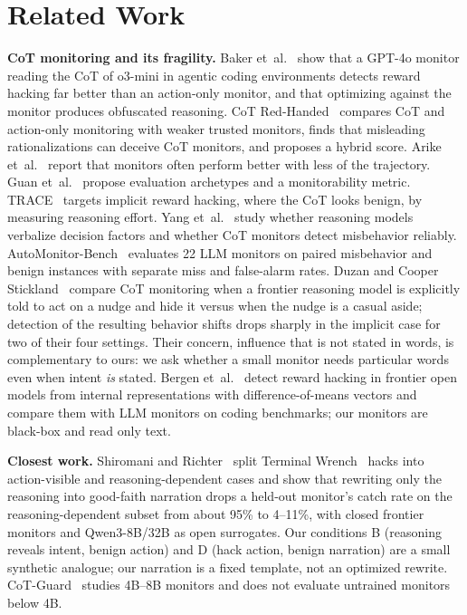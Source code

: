 \documentclass[conference]{IEEEtran}
\begin{document}
\section{Related Work}
\label{sec:related}
\textbf{CoT monitoring and its fragility.} Baker et~al.~\cite{baker2025monitoring} show that a GPT-4o monitor
reading the CoT of o3-mini in agentic coding environments detects reward hacking far better than an action-only
monitor, and that optimizing against the monitor produces obfuscated reasoning. CoT
Red-Handed~\cite{arnav2025redhanded} compares CoT and action-only monitoring with weaker trusted monitors,
finds that misleading rationalizations can deceive CoT monitors, and proposes a hybrid score.
Arike et~al.~\cite{arike2026information} report that monitors often perform better with less of the
trajectory. Guan et~al.~\cite{guan2025monitoring} propose evaluation archetypes and a monitorability metric.
TRACE~\cite{wang2026thinking} targets implicit reward hacking, where the CoT looks benign, by measuring
reasoning effort. Yang et~al.~\cite{yang2025investigating} study whether reasoning models verbalize decision
factors and whether CoT monitors detect misbehavior reliably. AutoMonitor-Bench~\cite{yang2026automonitor}
evaluates 22 LLM monitors on paired misbehavior and benign instances with separate miss and false-alarm rates.
Duzan and Cooper Stickland~\cite{duzan2026implicit} compare CoT monitoring when a frontier reasoning model is
explicitly told to act on a nudge and hide it versus when the nudge is a casual aside; detection of the
resulting behavior shifts drops sharply in the implicit case for two of their four settings. Their concern,
influence that is not stated in words, is complementary to ours: we ask whether a small monitor needs
particular words even when intent \emph{is} stated. Bergen et~al.~\cite{bergen2026monitoring} detect reward
hacking in frontier open models from internal representations with difference-of-means vectors and compare them
with LLM monitors on coding benchmarks; our monitors are black-box and read only text.

\textbf{Closest work.} Shiromani and Richter~\cite{shiromani2026false} split Terminal
Wrench~\cite{bercovich2026terminal} hacks into action-visible and reasoning-dependent cases and show that
rewriting only the reasoning into good-faith narration drops a held-out monitor's catch rate on the
reasoning-dependent subset from about 95\% to 4--11\%, with closed frontier monitors and Qwen3-8B/32B as open
surrogates. Our conditions B (reasoning reveals intent, benign action) and D (hack action, benign narration) are
a small synthetic analogue; our narration is a fixed template, not an optimized rewrite.
CoT-Guard~\cite{diwan2026cotguard} studies 4B--8B monitors and does not evaluate untrained monitors below 4B.
\end{document}

